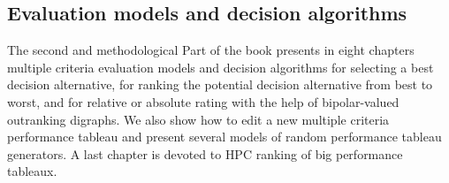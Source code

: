 % 
%
%

\begin{partbacktext}
  \part{Evaluation models and decision algorithms}
\noindent The second and methodological Part of the book presents in eight chapters multiple criteria evaluation models and decision algorithms for selecting a best decision alternative, for ranking the potential decision alternative from best to worst, and for relative or absolute rating with the help of bipolar-valued outranking digraphs. We also show how to edit a new multiple criteria performance tableau and present several models of random performance tableau generators. A last chapter is devoted to HPC ranking of big performance tableaux.
\end{partbacktext}